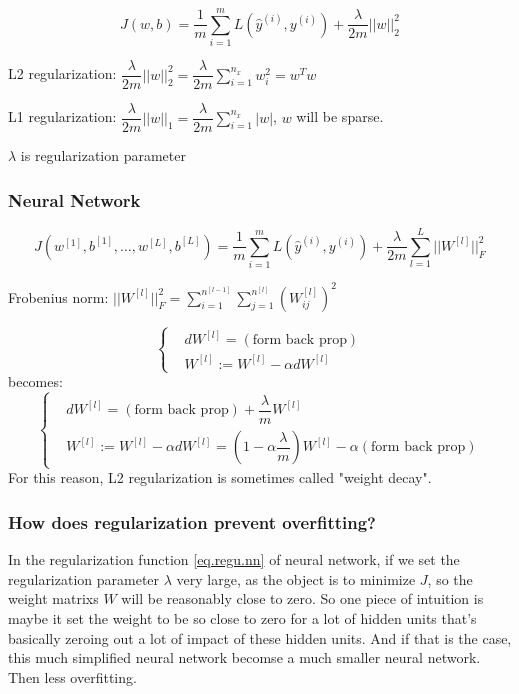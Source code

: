 $$J(w, b) = \dfrac{1}{m} \sum_{i = 1}^m L(\hat{y}^{(i)}, y^{(i)}) + \dfrac{\lambda}{2m} ||w||_2^2$$

L2 regularization: $\dfrac{\lambda}{2m} ||w||_2^2 = \dfrac{\lambda}{2m} \sum_{i = 1}^{n_x} w_i^2 = w^T w$

L1 regularization: $\dfrac{\lambda}{2m} ||w||_1 = \dfrac{\lambda}{2m} \sum_{i = 1}^{n_x} |w|$, $w$ will be sparse.

$\lambda$ is regularization parameter

\subsubsection{Neural Network}
\begin{equation}
J(w^{[1]}, b^{[1]}, \ldots, w^{[L]}, b^{[L]}) = \dfrac{1}{m} \sum_{i = 1}^m L(\hat{y}^{(i)}, y^{(i)}) + \dfrac{\lambda}{2m} \sum_{l = 1}^L ||W^{[l]}||_F^2
\label{eq.regu.nn}
\end{equation}

Frobenius norm: $||W^{[l]}||_F^2 = \sum_{i = 1}^{n^{[l - 1]}} \sum_{j = 1}^{n^{[l]}} (W_{ij}^{[l]})^2$

$$
\left\{
\begin{aligned}
& dW^{[l]} = (\text{form back prop}) \\
& W^{[l]} := W^{[l]} - \alpha dW^{[l]}
\end{aligned}
\right.
$$
becomes:
$$
\left\{
\begin{aligned}
& dW^{[l]} = (\text{form back prop}) + \dfrac{\lambda}{m} W^{[l]} \\
& W^{[l]} := W^{[l]} - \alpha dW^{[l]} = (1 - \alpha \dfrac{\lambda}{m}) W^{[l]} - \alpha (\text{form back prop})
\end{aligned}
\right.
$$
For this reason, L2 regularization is sometimes called "weight decay".

\subsubsection{How does regularization prevent overfitting?}
In the regularization function \eqref{eq.regu.nn} of neural network, if we set the regularization parameter $\lambda$ very large, as the object is to minimize $J$, so the weight matrixs $W$ will be reasonably close to zero.
So one piece of intuition is maybe it set the weight to be so close to zero for a lot of hidden units that's basically zeroing out a lot of impact of these hidden units.
And if that is the case, this much simplified neural network becomse a much smaller neural network. Then less overfitting.

